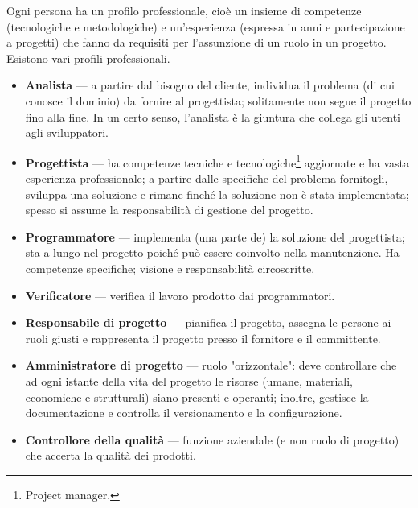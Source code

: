 \documentclass[a4paper]{article}
\begin{document}
		
Ogni persona ha un profilo professionale, cioè un insieme di competenze (tecnologiche e metodologiche) e un'esperienza (espressa in anni e partecipazione a progetti) che fanno da requisiti per l'assunzione di un ruolo in un progetto. Esistono vari profili professionali.
		
	\begin{itemize}
		
			
	\item \textbf{Analista} — a partire dal bisogno del cliente, individua il problema (di cui conosce il dominio) da fornire al progettista; solitamente non segue il progetto fino alla fine. In un certo senso, l'analista è la giuntura che collega gli utenti agli sviluppatori.
			
	\item \textbf{Progettista} — ha competenze tecniche e tecnologiche\footnote{Project manager.} aggiornate e ha vasta esperienza professionale; a partire dalle specifiche del problema fornitogli, sviluppa una soluzione e rimane finché la soluzione non è stata implementata; spesso si assume la responsabilità di gestione del progetto.
			
	\item \textbf{Programmatore} — implementa (una parte de) la soluzione del progettista; sta a lungo nel progetto poiché può essere coinvolto nella manutenzione. Ha competenze specifiche; visione e responsabilità circoscritte.
			
	\item \textbf{Verificatore} — verifica il lavoro prodotto dai programmatori.
			
	\item \textbf{Responsabile di progetto} — pianifica il progetto, assegna le persone ai ruoli giusti e rappresenta il progetto presso il fornitore e il committente.
			
	\item \textbf{Amministratore di progetto} — ruolo "orizzontale": deve controllare che ad ogni istante della vita del progetto le risorse (umane, materiali, economiche e strutturali) siano presenti e operanti; inoltre, gestisce la documentazione e controlla il versionamento e la configurazione.
			
	\item \textbf{Controllore della qualità} — funzione aziendale (e non ruolo di progetto) che accerta la qualità dei prodotti.
		
	\end{itemize}
\end{document}
